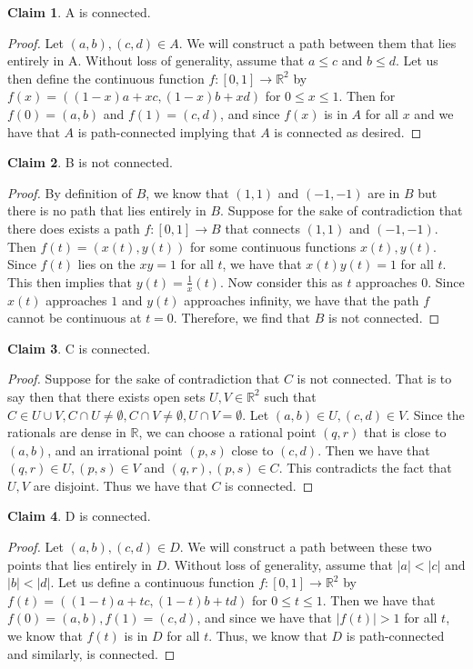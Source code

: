 \documentclass[11pt]{article}
\theoremstyle{definition}
\newtheorem*{claim}{Claim}
\newcommand{\R}{\mathbb{R}}
\begin{document}
\begin{claim}
A is connected.
\end{claim}
\begin{proof}
    Let $(a, b), (c, d) \in A$. We will construct a path between them that lies entirely in A. Without loss of generality, assume that $a\leq c$ and $b\leq d$. Let us then define the continuous function $f: [0, 1] \to \R^2$ by $f(x) = ((1 - x)a + xc, (1 - x)b + xd)$ for $0 \leq x \leq 1$. Then for $f(0) = (a, b)$ and $f(1) = (c, d)$, and since $f(x)$ is in $A$ for all $x$ and we have that $A$ is path-connected implying that $A$ is connected as desired.
\end{proof}
\begin{claim}
    B is not connected.
\end{claim}
\begin{proof}
    By definition of $B$, we know that $(1, 1)$ and $(-1, -1)$ are in $B$ but there is no path that lies entirely in $B.$ Suppose for the sake of contradiction that there does exists a path $f: [0, 1] \to B$ that connects $(1, 1)$ and $(-1, -1)$. Then $f(t) = (x(t), y(t))$ for some continuous functions $x(t), y(t)$. Since $f(t)$ lies on the $xy = 1$ for all $t$, we have that $x(t)y(t) = 1$ for all $t$. This then implies that $y(t) = \frac{1}{x}(t)$. Now consider this as $t$ approaches $0$. Since $x(t)$ approaches $1$ and $y(t)$ approaches infinity, we have that the path $f$ cannot be continuous at $t = 0$. Therefore, we find that $B$ is not connected.
\end{proof}
\begin{claim}
    C is connected.
\end{claim}
\begin{proof}
    Suppose for the sake of contradiction that $C$ is not connected. That is to say then that there exists open sets $U, V \in \R^2$ such that $C\in U\cup V, C\cap U \neq \emptyset, C\cap V \neq \emptyset, U\cap V = \emptyset$. Let $(a, b) \in U, (c, d)\in V$. Since the rationals are dense in $\R$, we can choose a rational point $(q, r)$ that is close to $(a, b)$, and an irrational point $(p, s)$ close to $(c, d)$. Then we have that $(q, r) \in U, (p, s)\in V$ and $(q, r), (p, s)\in C$. This contradicts the fact that $U, V$ are disjoint. Thus we have that $C$ is connected.
\end{proof}
\begin{claim}
    D is connected.
\end{claim}
\begin{proof}
    Let $(a, b), (c, d)\in D$. We will construct a path between these two points that lies entirely in $D$. Without loss of generality, assume that $|a| < |c|$ and $|b| < |d|$. Let us define a continuous function $f: [0, 1] \to \R^2$ by $f(t) = ((1 - t)a + tc, (1 - t)b + td)$ for $0\leq t \leq 1.$ Then we have that $f(0) = (a, b), f(1) = (c, d)$, and since we have that $|f(t)| > 1$ for all $t$, we know that $f(t)$ is in $D$ for all $t$. Thus, we know that $D$ is path-connected and similarly, is connected.
\end{proof}
\end{document}

